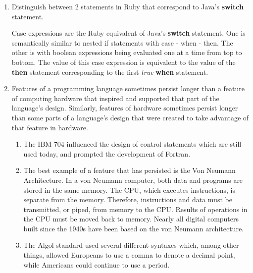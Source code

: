 \begin{enumerate}
\begin{answer}
\end{answer}

  \item Distinguish between 2 statements in Ruby
    that correspond to Java's \textbf{switch} statement.
    
\begin{answer}

    Case expressions are the Ruby equivalent of Java's \textbf{switch} statement. One is semantically similar to nested if statements with case - when - then. The other is with boolean expressions being evaluated one at a time from top to bottom. The value of this case expression is equivalent to the value of the \textbf{then} statement corresponding to the first \textit{true} \textbf{when} statement. 
    
\end{answer}

  \item Features of a programming language sometimes persist
    longer than a feature of computing hardware that inspired
    and supported that part of the language's design.
    Similarly, features of hardware sometimes persist longer
    than some parts of a language's design that were created
    to take advantage of that feature in hardware.
  
\begin{answer}

    \begin{enumerate}
        \item The IBM 704 influenced the design of control statements which
        are still used today, and prompted the development of Fortran.
    
	   \item The best example of a feature that has persisted is the
           Von Neumann Architecture. In a von Neumann computer, both
           data and programs are stored in the same memory. The CPU,
           which executes instructions, is separate from the
           memory. Therefore, instructions and data must be
           transmitted, or piped, from memory to the CPU. Results of
           operations in the CPU must be moved back to memory. Nearly
           all digital computers built since the 1940s have been based
           on the von Neumann architecture.
    
        \item The Algol standard used several different syntaxes which,
        among other things, allowed Europeans to use a comma to denote
        a decimal point, while Americans could continue to use a
        period.


\end{enumerate}
\end{answer}
\end{enumerate}
